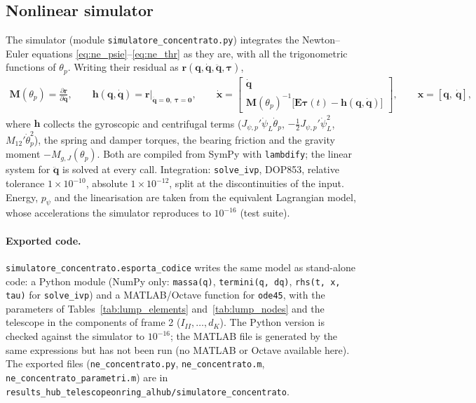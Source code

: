 \documentclass[10pt,a4paper]{article}
\numberwithin{equation}{section}
\begin{document}
\subsection{Nonlinear simulator}\label{subsec:lump_sim}
The simulator (module \texttt{simulatore\_concentrato.py}) integrates the Newton--Euler equations \eqref{eq:ne_psie}--\eqref{eq:ne_thr} as they are, with all the trigonometric functions of $\theta_p$. Writing their residual as $\mathbf r(\mathbf q, \dot{\mathbf q}, \ddot{\mathbf q}, \boldsymbol\tau)$,
\begin{gather}
\mathbf M(\theta_p) = \frac{\partial\mathbf r}{\partial\ddot{\mathbf q}},\qquad \mathbf h(\mathbf q, \dot{\mathbf q}) = \mathbf r\big|_{\ddot{\mathbf q} = \mathbf 0,\ \boldsymbol\tau = \mathbf 0},\qquad \dot{\mathbf x} = \begin{bmatrix}\dot{\mathbf q}\\ \mathbf M(\theta_p)^{-1}\bigl[\mathbf E\boldsymbol\tau(t) - \mathbf h(\mathbf q, \dot{\mathbf q})\bigr]\end{bmatrix},\qquad \mathbf x = [\mathbf q,\ \dot{\mathbf q}],
\end{gather}
where $\mathbf h$ collects the gyroscopic and centrifugal terms ($J_{\psi,p}'\dot\psi_L\dot\theta_p$, $-\tfrac12 J_{\psi,p}'\dot\psi_L^2$, $M_{12}'\dot\theta_p^2$), the spring and damper torques, the bearing friction and the gravity moment $-M_{g,J}(\theta_p)$. Both are compiled from SymPy with \texttt{lambdify}; the linear system for $\ddot{\mathbf q}$ is solved at every call. Integration: \texttt{solve\_ivp}, DOP853, relative tolerance $1\times10^{-10}$, absolute $1\times10^{-12}$, split at the discontinuities of the input. Energy, $p_\psi$ and the linearisation are taken from the equivalent Lagrangian model, whose accelerations the simulator reproduces to $10^{-16}$ (test suite).
\paragraph{Exported code.} \texttt{simulatore\_concentrato.esporta\_codice} writes the same model as stand-alone code: a Python module (NumPy only: \texttt{massa(q)}, \texttt{termini(q, dq)}, \texttt{rhs(t, x, tau)} for \texttt{solve\_ivp}) and a MATLAB/Octave function for \texttt{ode45}, with the parameters of Tables~\ref{tab:lump_elements} and~\ref{tab:lump_nodes} and the telescope in the components of frame 2 ($I_{II}, \dots, d_K$). The Python version is checked against the simulator to $10^{-16}$; the MATLAB file is generated by the same expressions but has not been run (no MATLAB or Octave available here). The exported files (\texttt{ne\_concentrato.py}, \texttt{ne\_concentrato.m}, \texttt{ne\_concentrato\_parametri.m}) are in \texttt{results\_hub\_telescopeonring\_alhub/simulatore\_concentrato}.
\end{document}
